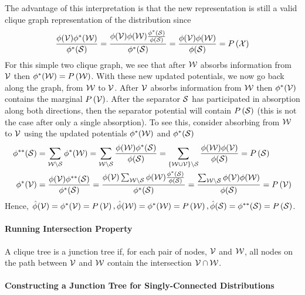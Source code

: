 The advantage of this interpretation is that the new representation is still a valid clique graph representation of the distribution since
\begin{align*}
	\frac{\phi(\mathcal{V})\phi^*(\mathcal{W})}{\phi^*(\mathcal{S})}=\frac{\phi(\mathcal{V})\phi(\mathcal{W})\frac{\phi^*(\mathcal{S})}{\phi(\mathcal{S})}}{\phi^*(\mathcal{S})}=\frac{\phi(\mathcal{V})\phi(\mathcal{W})}{\phi(\mathcal{S})}=P\left(\mathcal{X}\right)
\end{align*}
For this simple two clique graph, we see that after $\mathcal{W}$ absorbs information from $\mathcal{V}$ then $\phi^*(\mathcal{W})=P\left(\mathcal{W}\right)$. With these new updated potentials, we now go back along the graph, from $\mathcal{W}$ to $\mathcal{V}$. After $\mathcal{V}$ absorbs information from $\mathcal{W}$ then $\phi^*(\mathcal{V})$ contains the marginal $P\left(\mathcal{V}\right)$. After the separator $\mathcal{S}$ has participated in absorption along both directions, then the separator potential will contain $P\left(\mathcal{S}\right)$ (this is not the case after only a single absorption). To see this, consider absorbing from $\mathcal{W}$ to $\mathcal{V}$ using the updated potentials $\phi^*(\mathcal{W})$ and $\phi^*(\mathcal{S})$
\begin{align*}
	\phi^{**}(\mathcal{S})&=\sum_{\mathcal{W}\setminus\mathcal{S}}\phi^*(\mathcal{W})=\sum_{\mathcal{W}\setminus\mathcal{S}}\frac{\phi(\mathcal{W})\phi^*(\mathcal{S})}{\phi(\mathcal{S})}=\sum_{\{\mathcal{W}\cup\mathcal{V}\}\setminus\mathcal{S}}\frac{\phi(\mathcal{W})\phi(\mathcal{V})}{\phi(\mathcal{S})}=P\left(\mathcal{S}\right) \\
	\phi^*(\mathcal{V})&=\frac{\phi(\mathcal{V})\phi^{**}(\mathcal{S})}{\phi^*(\mathcal{S})}=\frac{\phi(\mathcal{V})\sum_{\mathcal{W}\setminus\mathcal{S}}\phi(\mathcal{W})\frac{\phi^*(\mathcal{S})}{\phi(\mathcal{S})}}{\phi^*(\mathcal{S})}=\frac{\sum_{\mathcal{W}\setminus\mathcal{S}}\phi(\mathcal{V})\phi(\mathcal{W})}{\phi(\mathcal{S})}=P\left(\mathcal{V}\right)
\end{align*}
Hence, $\hat{\phi}(\mathcal{V})=\phi^*(\mathcal{V})=P\left(\mathcal{V}\right),\hat{\phi}(\mathcal{W})=\phi^*(\mathcal{W})=P\left(\mathcal{W}\right),\hat{\phi}(\mathcal{S})=\phi^{**}(\mathcal{S})=P\left(\mathcal{S}\right)$.

\paragraph{Running Intersection Property}

A clique tree is a junction tree if, for each pair of nodes, $\mathcal{V}$ and $\mathcal{W}$, all nodes on the path between $\mathcal{V}$ and $\mathcal{W}$ contain the intersection $\mathcal{V}\cap\mathcal{W}$.

\paragraph{Constructing a Junction Tree for Singly-Connected Distributions}

